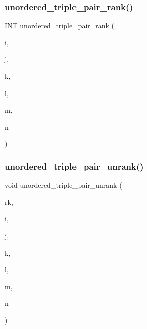 \subsubsection{\texorpdfstring{unordered\+\_\+triple\+\_\+pair\+\_\+rank()}{unordered\_triple\_pair\_rank()}}
{\footnotesize\ttfamily \mbox{\hyperlink{galois_8h_a09fddde158a3a20bd2dcadb609de11dc}{I\+NT}} unordered\+\_\+triple\+\_\+pair\+\_\+rank (\begin{DoxyParamCaption}\item[{\mbox{\hyperlink{galois_8h_a09fddde158a3a20bd2dcadb609de11dc}{I\+NT}}}]{i,  }\item[{\mbox{\hyperlink{galois_8h_a09fddde158a3a20bd2dcadb609de11dc}{I\+NT}}}]{j,  }\item[{\mbox{\hyperlink{galois_8h_a09fddde158a3a20bd2dcadb609de11dc}{I\+NT}}}]{k,  }\item[{\mbox{\hyperlink{galois_8h_a09fddde158a3a20bd2dcadb609de11dc}{I\+NT}}}]{l,  }\item[{\mbox{\hyperlink{galois_8h_a09fddde158a3a20bd2dcadb609de11dc}{I\+NT}}}]{m,  }\item[{\mbox{\hyperlink{galois_8h_a09fddde158a3a20bd2dcadb609de11dc}{I\+NT}}}]{n }\end{DoxyParamCaption})}

\mbox{\label{combinatorics_8_c_ad4b2dfae1b313c4e87a477ba5d48bce8}} 
\subsubsection{\texorpdfstring{unordered\+\_\+triple\+\_\+pair\+\_\+unrank()}{unordered\_triple\_pair\_unrank()}}
{\footnotesize\ttfamily void unordered\+\_\+triple\+\_\+pair\+\_\+unrank (\begin{DoxyParamCaption}\item[{\mbox{\hyperlink{galois_8h_a09fddde158a3a20bd2dcadb609de11dc}{I\+NT}}}]{rk,  }\item[{\mbox{\hyperlink{galois_8h_a09fddde158a3a20bd2dcadb609de11dc}{I\+NT}} \&}]{i,  }\item[{\mbox{\hyperlink{galois_8h_a09fddde158a3a20bd2dcadb609de11dc}{I\+NT}} \&}]{j,  }\item[{\mbox{\hyperlink{galois_8h_a09fddde158a3a20bd2dcadb609de11dc}{I\+NT}} \&}]{k,  }\item[{\mbox{\hyperlink{galois_8h_a09fddde158a3a20bd2dcadb609de11dc}{I\+NT}} \&}]{l,  }\item[{\mbox{\hyperlink{galois_8h_a09fddde158a3a20bd2dcadb609de11dc}{I\+NT}} \&}]{m,  }\item[{\mbox{\hyperlink{galois_8h_a09fddde158a3a20bd2dcadb609de11dc}{I\+NT}} \&}]{n }\end{DoxyParamCaption})}

